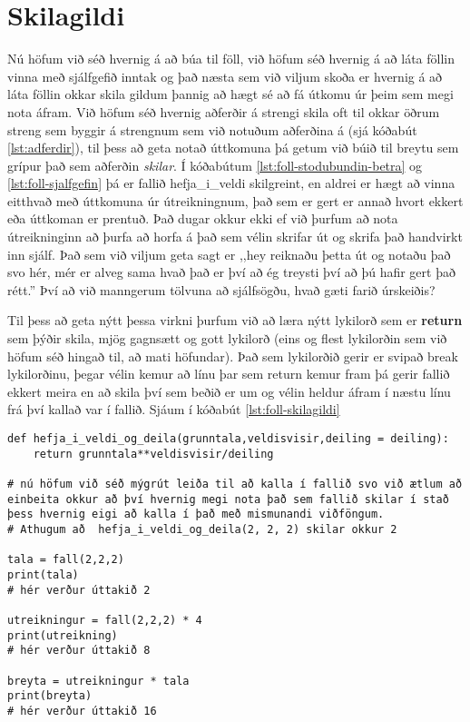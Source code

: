 \section{Skilagildi}\label{uk:skilagildi}
Nú höfum við séð hvernig á að búa til föll, við höfum séð hvernig á að láta föllin vinna með sjálfgefið inntak og það næsta sem við viljum skoða er hvernig á að láta föllin okkar skila gildum þannig að hægt sé að fá útkomu úr þeim sem megi nota áfram.
Við höfum séð hvernig aðferðir á strengi skila oft til okkar öðrum streng sem byggir á strengnum sem við notuðum aðferðina á (sjá kóðabút \ref{lst:adferdir}), til þess að geta notað úttkomuna þá getum við búið til breytu sem grípur það sem aðferðin \textit{skilar}.
Í kóðabútum \ref{lst:foll-stodubundin-betra} og \ref{lst:foll-sjalfgefin} þá er fallið hefja\_i\_veldi skilgreint, en aldrei er hægt að vinna eitthvað með úttkomuna úr útreikningnum, það sem er gert er annað hvort ekkert eða úttkoman er prentuð.
Það dugar okkur ekki ef við þurfum að nota útreikninginn að þurfa að horfa á það sem vélin skrifar út og skrifa það handvirkt inn sjálf.
Það sem við viljum geta sagt er ,,hey reiknaðu þetta út og notaðu það svo hér, mér er alveg sama hvað það er því að ég treysti því að þú hafir gert það rétt.''
Því að við manngerum tölvuna að sjálfsögðu, hvað gæti farið úrskeiðis?

Til þess að geta nýtt þessa virkni þurfum við að læra nýtt lykilorð sem er \textbf{return} sem þýðir skila, mjög gagnsætt og gott lykilorð (eins og flest lykilorðin sem við höfum séð hingað til, að mati höfundar).
Það sem lykilorðið gerir er svipað break lykilorðinu, þegar vélin kemur að línu þar sem return kemur fram þá gerir fallið ekkert meira en að skila því sem beðið er um og vélin heldur áfram í næstu línu frá því kallað var í fallið.
Sjáum í kóðabút \ref{lst:foll-skilagildi}

\begin{lstlisting}[caption=Hvernig á að láta fall skila gildi með return skipuninni, label=lst:foll-skilagildi]
def hefja_i_veldi_og_deila(grunntala,veldisvisir,deiling = deiling):	
	return grunntala**veldisvisir/deiling
	
# nú höfum við séð mýgrút leiða til að kalla í fallið svo við ætlum að einbeita okkur að því hvernig megi nota það sem fallið skilar í stað þess hvernig eigi að kalla í það með mismunandi viðföngum.
# Athugum að  hefja_i_veldi_og_deila(2, 2, 2) skilar okkur 2

tala = fall(2,2,2)
print(tala)
# hér verður úttakið 2

utreikningur = fall(2,2,2) * 4
print(utreikning)
# hér verður úttakið 8

breyta = utreikningur * tala
print(breyta)
# hér verður úttakið 16
\end{lstlisting}
 

